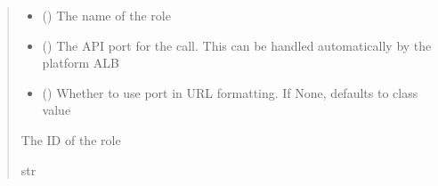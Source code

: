 \documentclass[letterpaper,10pt,english]{sphinxmanual}
\begin{document}
\begin{fulllineitems}
\begin{fulllineitems}
\begin{sphinxVerbatim}[commandchars=\\\{\}]
 
  
\end{sphinxVerbatim}
\begin{quote}\begin{description}
\begin{itemize}
\item {} 
\sphinxAtStartPar
{} () \textendash{} The name of the role

\item {} 
\sphinxAtStartPar
{} (\sphinxstyleliteralemphasis{\sphinxupquote{ (}}\sphinxstyleliteralemphasis{\sphinxupquote{)}}) \textendash{} The API port for the call. This can be handled automatically by the platform ALB

\item {} 
\sphinxAtStartPar
{} (\sphinxstyleliteralemphasis{\sphinxupquote{ (}}\sphinxstyleliteralemphasis{\sphinxupquote{)}}) \textendash{} Whether to use port in URL formatting. If None, defaults to class value

\end{itemize}

\sphinxAtStartPar
{} \textendash{} The ID of the role

\sphinxAtStartPar
str

\end{description}\end{quote}


\end{fulllineitems}
\end{fulllineitems}
\end{document}
